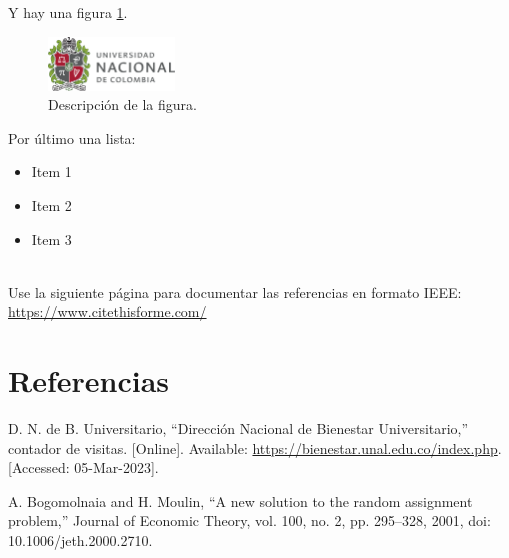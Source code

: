 \documentclass{article}
\begin{document}
Y hay una figura \ref{fig:ejemplo}.\\

\renewcommand{\figurename}{Figura}
\begin{figure}[htbp]
  \centering
  \includegraphics[width=0.3\textwidth]{logo_universidad.png}
  \caption{Descripción de la figura.}
  \label{fig:ejemplo}
\end{figure}

Por último una lista:

\begin{itemize}
  \item Item 1
  \item Item 2
  \item Item 3\\\\
\end{itemize}


Use la siguiente página para documentar las referencias en formato IEEE: 
\href{https://www.citethisforme.com/}{https://www.citethisforme.com/}

\section{Referencias}
\renewcommand{\refname}{}
\begin{thebibliography}{9}

 \label{ref:bienUniv}D. N. de B. Universitario, “Dirección Nacional de Bienestar Universitario,” contador de visitas. [Online]. Available: \href{https://bienestar.unal.edu.co/index.php}{https://bienestar.unal.edu.co/index.php}. [Accessed: 05-Mar-2023].  

 \label{ref:PBS} A. Bogomolnaia and H. Moulin, “A new solution to the random 
assignment problem,” Journal of Economic Theory, vol. 100, no. 2, pp. 295–328, 2001, doi: 
10.1006/jeth.2000.2710.



\end{thebibliography}
\end{document}
